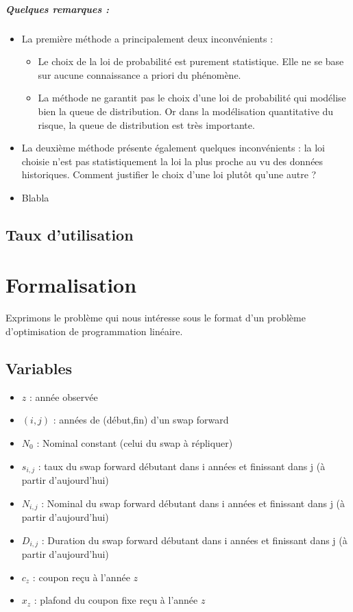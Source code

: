 \documentclass[12pt,a4paper]{report}
\begin{document}
\paragraph{Quelques remarques :}
\begin{itemize}
    \item La première méthode a principalement deux inconvénients :
    \begin{itemize}
        \item Le choix de la loi de probabilité est purement statistique. Elle ne se base sur aucune connaissance a priori du phénomène.
        \item La méthode ne garantit pas le choix d’une loi de probabilité qui modélise bien la queue de distribution. Or dans la modélisation quantitative du risque, la queue de distribution est très importante.
    \end{itemize}
    \item La deuxième méthode présente également quelques inconvénients : la loi choisie n’est pas statistiquement la loi la plus proche au vu des données historiques. Comment justifier le choix d’une loi plutôt qu’une autre ?
    \item Blabla
\end{itemize}

\section{Taux d'utilisation}

\newpage

\chapter{Formalisation}
Exprimons le problème qui nous intéresse sous le format d'un problème d'optimisation de programmation linéaire.

\section{Variables}

\begin{itemize}\itemsep2pt
    \item $z$ : année observée
    \item $( i , j )$ : années de (début,fin) d'un swap forward
    \item $N_0$ : Nominal constant (celui du swap à répliquer)
    \item $s_{i,j}$ : taux du swap forward débutant dans i années et finissant dans j (à partir d'aujourd'hui)
    \item $N_{i,j}$ : Nominal du swap forward débutant dans i années et finissant dans j (à partir d'aujourd'hui)
    \item $D_{i,j}$ : Duration du swap forward débutant dans i années et finissant dans j (à partir d'aujourd'hui)
    \item $c_z$ : coupon reçu à l'année $z$
    \item $x_z$ : plafond du coupon fixe reçu à l'année $z$
\end{itemize}
\end{document}
